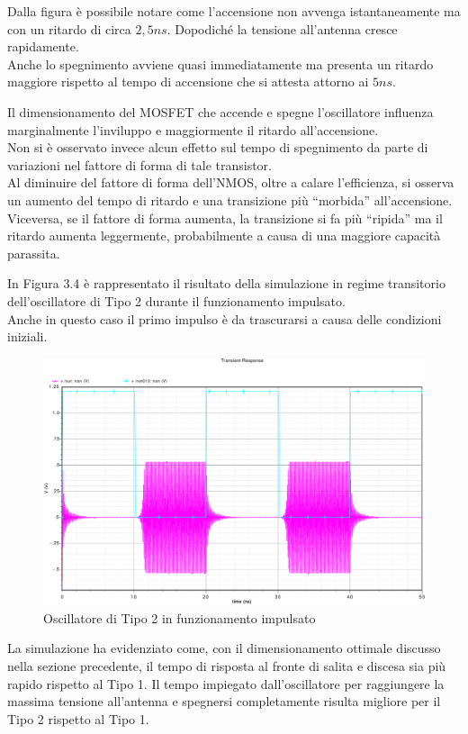 \documentclass[a4paper, 12pt]{memoir}
\begin{document}
Dalla figura è possibile notare come l'accensione non avvenga istantaneamente
ma con un ritardo di circa $2,5ns$. Dopodiché la tensione all'antenna cresce
rapidamente.\\
Anche lo spegnimento avviene quasi immediatamente ma presenta un ritardo 
maggiore rispetto al tempo di accensione che si attesta attorno ai $5ns$. 

Il dimensionamento del MOSFET che accende e spegne l'oscillatore influenza
marginalmente l'inviluppo e maggiormente il ritardo all'accensione.\\
Non si è osservato invece alcun effetto sul tempo di spegnimento da parte di
variazioni nel fattore di forma di tale transistor.\\
Al diminuire del fattore di forma dell'NMOS, oltre a calare l'efficienza, si
osserva un aumento del tempo di ritardo e una transizione più ``morbida''
all'accensione. Viceversa, se il fattore di forma aumenta, la transizione si fa
più ``ripida'' ma il ritardo aumenta leggermente, probabilmente a causa di una
maggiore capacità parassita.

In Figura 3.4 è rappresentato il risultato della simulazione in regime
transitorio dell'oscillatore di Tipo 2 durante il funzionamento impulsato.\\
Anche in questo caso il primo impulso è da trascurarsi a causa delle condizioni
iniziali.
\begin{figure}[h]
\centering
\includegraphics[width=\textheight, angle=90]{images/tipo2-impulsato.pdf}
\caption{Oscillatore di Tipo 2 in funzionamento impulsato}
\end{figure}

La simulazione ha evidenziato come, con il dimensionamento ottimale discusso
nella sezione precedente, il tempo di risposta al fronte di salita e discesa
sia più rapido rispetto al Tipo 1. Il tempo impiegato dall'oscillatore per
raggiungere la massima tensione all'antenna e spegnersi completamente risulta
migliore per il Tipo 2 rispetto al Tipo 1.
\end{document}
